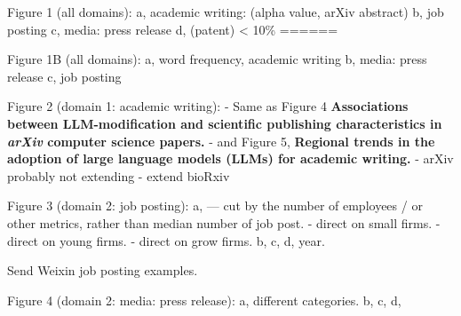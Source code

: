 

Figure 1 (all domains): 
a, academic writing: (alpha value, arXiv abstract)
b, job posting
c, media: press release
d, (patent) < 10\%
======


Figure 1B (all domains): 
a, word frequency, academic writing
b, media: press release
c, job posting



Figure 2 (domain 1: academic writing): 
- Same as Figure 4 \textbf{Associations between LLM-modification and scientific publishing characteristics in \textit{arXiv} computer science papers. } 
- and Figure 5, \textbf{Regional trends in the adoption of large language models (LLMs) for academic writing.}  
    - arXiv probably not extending 
    - extend bioRxiv 


Figure 3 (domain 2: job posting): 
a, --- cut by the number of employees / or other metrics, rather than median number of job post.  
- direct on small firms. 
- direct on young firms. 
- direct on grow firms. 
b, 
c, 
d, year. 

Send Weixin job posting examples. 





Figure 4 (domain 2: media: press release): 
a, different categories. 
b, 
c, 
d, 





